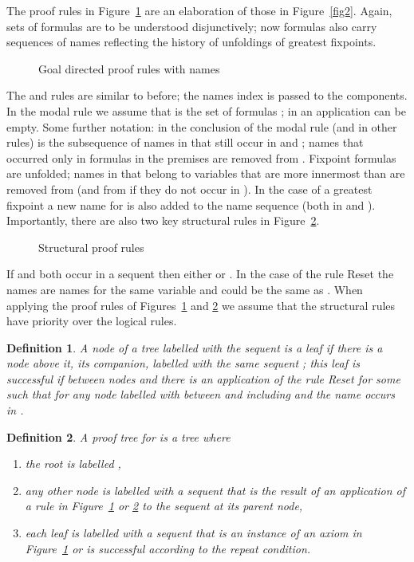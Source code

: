 \documentclass[copyright,creativecommons]{eptcs}
\newtheorem{defin}{Definition}
\begin{document}
The proof rules in Figure~\ref{fig4} 
are an elaboration of those in Figure~\ref{fig2}.
Again, sets of formulas are to be understood disjunctively; now formulas also
carry  sequences of names reflecting the history of 
unfoldings of greatest fixpoints.
\begin{figure}




\caption{Goal directed proof rules with names} 
\label{fig4}
\end{figure}
The  and   rules are similar to before; the names index
is passed to the components. In the modal rule
we assume that 
is the set of formulas ;
in an  application  can be empty. Some further notation:
 in the conclusion of the modal rule (and in other rules)
is the subsequence of names in   that still occur in  and ;
names that occurred only in formulas in the premises  are removed from
. Fixpoint formulas are unfolded; names in  that belong to variables that
are more innermost than  are removed from  (and from  if they do not
occur in ). In the case of a greatest  fixpoint a new name for  is
also added to the name sequence (both in  and ). 
Importantly, there are also two key structural rules in Figure~\ref{fig5}.
\begin{figure}






\caption{Structural  proof rules} 
\label{fig5}
\end{figure}
If  and  both occur in  a sequent  then
either  or .  In the case of the 
rule Reset the names 
are names for the same variable   and  could be the same as .
When applying the proof rules of Figures~\ref{fig4} and \ref{fig5} we assume
that the structural rules have  priority over the logical rules.
 

\begin{defin}
\label{leaf}
A node  of a tree labelled with the sequent
 is a \emph{leaf} if
there is a node  above it, its \emph{companion}, 
labelled with the same sequent
; this leaf is \emph{successful} if between nodes
 and  there is an application  of the rule Reset for some 
such that for any node  labelled with  between
and including  and  the name  occurs in .
\end{defin}


\begin{defin}
A \emph{proof
tree} for  is a tree where
\begin{enumerate}
\item the root is labelled ,
\item any  other node is labelled with a  sequent that is the result of an 
application of a rule in  Figure~\ref{fig4} or \ref{fig5} to the sequent
at its parent node, 
\item each leaf is labelled with a sequent
that is  an instance of an  axiom in Figure~\ref{fig4}
or is successful according to  the repeat condition. 
\end{enumerate}
\end{defin}
\end{document}

